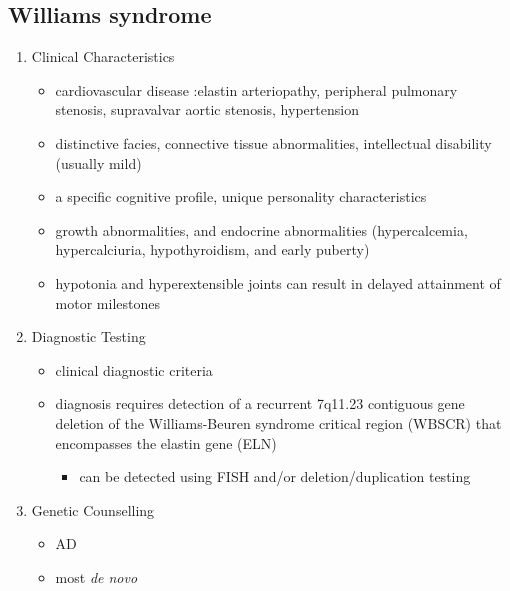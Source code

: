 \documentclass[12pt]{scrartcl}
\begin{document}
\subsection{Williams syndrome}
\label{sec:org53e80e1}
\begin{enumerate}
\item Clinical Characteristics
\label{sec:org5311bb2}
\begin{itemize}
\item cardiovascular disease :elastin arteriopathy, peripheral pulmonary
stenosis, supravalvar aortic stenosis, hypertension
\item distinctive facies, connective tissue abnormalities, intellectual
disability (usually mild)
\item a specific cognitive profile, unique personality characteristics
\item growth abnormalities, and endocrine abnormalities (hypercalcemia,
hypercalciuria, hypothyroidism, and early puberty)
\item hypotonia and hyperextensible joints can result in delayed
attainment of motor milestones
\end{itemize}

\item Diagnostic Testing
\label{sec:orgb263475}
\begin{itemize}
\item clinical diagnostic criteria
\item diagnosis requires detection of a recurrent 7q11.23 contiguous gene deletion of the Williams-Beuren syndrome critical region (WBSCR) that encompasses the elastin gene (ELN)
\begin{itemize}
\item can be detected using FISH and/or deletion/duplication testing
\end{itemize}
\end{itemize}
\item Genetic Counselling
\label{sec:org8897b3d}
\begin{itemize}
\item AD
\item most \emph{de novo}
\end{itemize}
\end{enumerate}
\end{document}
